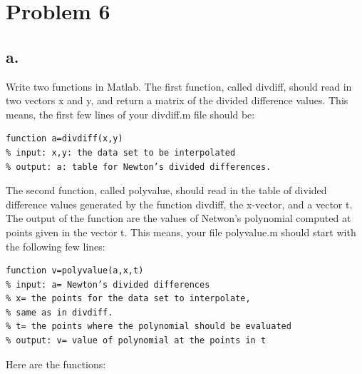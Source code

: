 \documentclass[]{article}
\begin{document}
\section{Problem 6}\label{problem-6}

\subsection{a.}\label{a.}

Write two functions in Matlab. The first function, called divdiff,
should read in two vectors x and y, and return a matrix of the divided
difference values. This means, the first few lines of your divdiff.m
file should be:

\begin{verbatim}
function a=divdiff(x,y)
% input: x,y: the data set to be interpolated
% output: a: table for Newton’s divided differences.
\end{verbatim}

The second function, called polyvalue, should read in the table of
divided difference values generated by the function divdiff, the
x-vector, and a vector t. The output of the function are the values of
Netwon's polynomial computed at points given in the vector t. This
means, your file polyvalue.m should start with the following few lines:

\begin{verbatim}
function v=polyvalue(a,x,t)
% input: a= Newton’s divided differences
% x= the points for the data set to interpolate,
% same as in divdiff.
% t= the points where the polynomial should be evaluated
% output: v= value of polynomial at the points in t
\end{verbatim}

Here are the functions:
\end{document}

